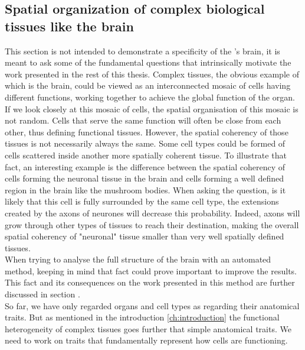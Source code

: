          \subsection{Spatial organization of complex biological tissues like the brain}
     This section is not intended to demonstrate a specificity of the \platy{}'s brain, it is meant to ask some of the fundamental questions that intrinsically motivate the work presented in the rest of this thesis. Complex tissues, the obvious example of which is the brain, could be viewed as an interconnected mosaic of cells having different functions, working together to achieve the global function of the organ.\\
     
     If we look closely at this mosaic of cells, the spatial organisation of this mosaic is not random. Cells that serve the same function will often be close from each other, thus defining functional tissues. However, the spatial coherency of those tissues is not necessarily always the same. Some cell types could be formed of cells scattered inside another more spatially coherent tissue. To illustrate that fact, an interesting example is the difference between the spatial coherency of cells forming the neuronal tissue in the brain and cells forming a well defined region in the brain like the mushroom bodies. When asking the question, is it likely that this cell is fully surrounded by the same cell type, the extensions created by the axons of neurones will decrease this probability. Indeed, axons will grow through other types of tissues to reach their destination, making the overall spatial coherency of "neuronal" tissue smaller than very well spatially defined tissues.\\
     
     When trying to analyse the full structure of the brain with an automated method, keeping in mind that fact could prove important to improve the results. This fact and its consequences on the work presented in this method are further discussed in section .\\
     
     So far, we have only regarded organs and cell types as regarding their anatomical traits. But as mentioned in the introduction \ref{ch:introduction} the functional heterogeneity of complex tissues goes further that simple anatomical traits. We need to work on traits that fundamentally represent how cells are functioning.
     
